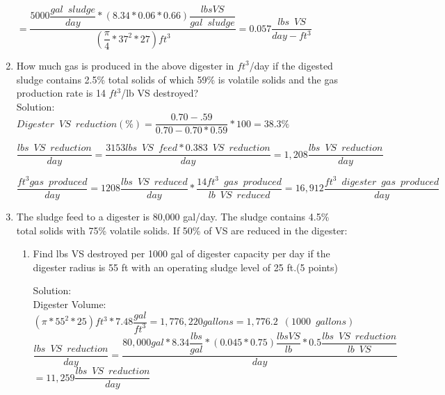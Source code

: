 \begin{enumerate}
{
$=\dfrac
	{
		5000
		\dfrac
			{gal \enspace sludge}
			{day}
		*(8.34*0.06*0.66) 
		\dfrac
			{lbs VS}
			{gal \enspace  sludge}
	}
	{
		(\dfrac
			{\pi}
			{4}*37^2*27)ft^3
	}
=\boxed
	{
		0.057 \dfrac
			{lbs \enspace VS}
			{day-ft^3}
	}
$}


\item How much gas is produced in the above digester in $ft^3$/day if the digested sludge contains 2.5\% total solids of which 59\% is volatile solids and the gas production rate is 14 $ft^3$/lb VS destroyed?\\
Solution:\\

{
$
Digester \enspace VS \enspace reduction (\%)=
	\dfrac
	{0.70 - .59}
	{0.70 - 0.70 *0.59}
	*100=38.3\%
$
}\\
\vspace{6mm}

{
$
	\dfrac
	{
	lbs \enspace VS \enspace reduction
	}
	{
	day
	}
	=
	\dfrac
	{
	3153 lbs \enspace VS \enspace feed
		*  0.383 \enspace VS \enspace reduction
	}
	{
	day
	}
 	=1,208
	\dfrac
	{
	lbs \enspace VS \enspace reduction
	}
	{
	day 
	}
$
}\\
\vspace{6mm}

{
$
	\dfrac 
	{
	ft^3 gas \enspace produced
	}
	{
	day
	}
	=
	1208 \dfrac
			{
			lbs \enspace VS \enspace reduced
			}
			{
			day
			}
			*
		\dfrac
		{
		14 ft^3 \enspace gas \enspace produced
		}
		{
		lb \enspace VS \enspace reduced
		}
		=16,912 \dfrac
				{
				ft^3 \enspace digester \enspace 					gas \enspace produced
				}
				{
				day
				}
$
} 
\item The sludge feed to a digester is 80,000 gal/day. The sludge contains 4.5\% total solids with 75\% volatile solids. If 50\% of VS are reduced in the digester: 



\begin{enumerate}
\item Find lbs VS destroyed per 1000 gal of digester capacity per day if the digester radius is 55 ft with an operating sludge level of 25 ft.(5 points)

\vspace{1cm}
Solution:\\
Digester Volume: 
$
{
		(\pi*55^2*25)ft^3 *7.48 \dfrac{gal}{ft^3}
	}=1,776,220 gallons=1,776.2 \enspace(1000 \enspace gallons)
$
\\
\vspace{3mm}
$
	\dfrac
	{
	lbs \enspace VS \enspace reduction
	}
	{
	day
	}
	=
	\dfrac
	{
	80,000 gal * 8.34 \dfrac{lbs}{gal}*(0.045*0.75) \dfrac{lbs VS}{lb}*0.5\dfrac{lbs \enspace VS \enspace  reduction}{lb \enspace VS}
	}
	{
	day
	}$\\
\vspace{0.25cm}
$
 	=11,259
	\dfrac
	{
	lbs \enspace VS \enspace reduction
	}
	{
	day 
	}
$
\\
\vspace{3mm}



\end{enumerate}
\end{enumerate}
